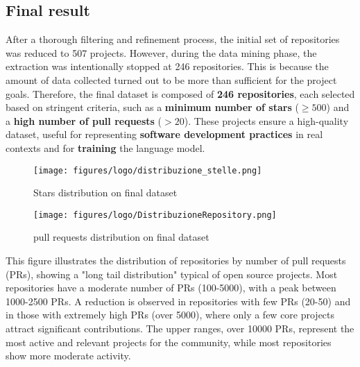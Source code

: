 \subsection{Final result}
After a thorough filtering and refinement process, the initial set of repositories was reduced to 507 projects. However, during the data mining phase, the extraction was intentionally stopped at 246 repositories. This is because the amount of data collected turned out to be more than sufficient for the project goals. Therefore, the final dataset is composed of \textbf{246 repositories}, each selected based on stringent criteria, such as a \textbf{minimum number of stars} (\( \geq 500 \)) and a \textbf{high number of pull requests} (\( > 20 \)).
These projects ensure a high-quality dataset, useful for representing \textbf{software development practices} in real contexts and for \textbf{training} the language model.
\begin{figure}[H]
	\centering
	\texttt{[image: figures/logo/distribuzione\_stelle.png]}
	\caption{Stars distribution on final dataset}       
\end{figure}
\begin{figure}[H]
	\centering
	\texttt{[image: figures/logo/DistribuzioneRepository.png]}
	\caption{pull requests distribution on final dataset}       
\end{figure}
This figure illustrates the distribution of repositories by number of pull requests (PRs), showing a "long tail distribution" typical of open source projects. Most repositories have a moderate number of PRs (100-5000), with a peak between 1000-2500 PRs. A reduction is observed in repositories with few PRs (20-50) and in those with extremely high PRs (over 5000), where only a few core projects attract significant contributions. The upper ranges, over 10000 PRs, represent the most active and relevant projects for the community, while most repositories show more moderate activity.
